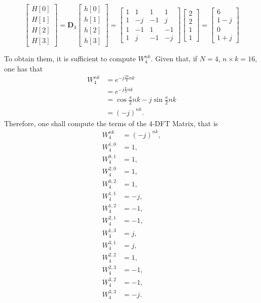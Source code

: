 \documentclass[\documentfontsize, twocolumn]{\classname}
\begin{document}
\begin{equation*}
    \begin{bmatrix} H[0] \\ H[1] \\ H[2] \\ H[3] \end{bmatrix}
        =
        \bm{D}_4
        \begin{bmatrix} h[0] \\ h[1] \\ h[2] \\ h[3] \end{bmatrix}
        =
        \begin{bmatrix}
            1 & 1 & 1 & 1 \\
            1 & -j & -1 & j \\
            1 & -1 & 1 & -1 \\
            1 & j & -1 & -j
        \end{bmatrix}
        \begin{bmatrix} 2 \\ 2 \\ 1 \\ 1 \end{bmatrix}
        =
        \begin{bmatrix}
            6 \\
            1 - j \\
            0 \\
            1 + j
        \end{bmatrix}
\end{equation*}

To obtain them, it is sufficient to compute $W_4^{nk}$. Given that, if $N=4$, $n \times k = 16$, one has that
\begin{align*}
    W_4^{nk} &= e ^ {-j\frac {2\pi}{4} nk}\\
             &= e ^ {-j\frac {\pi}{2} nk}\\
             &= \cos {\frac {\pi}{2} nk} - j\sin{\frac{\pi}{2}nk}\\
             &= (-j)^{nk}.
\end{align*}
Therefore, one shall compute the terms of the $4$-DFT Matrix, that is
\begin{align*}
    W_4^{nk} &= (-j)^{nk},\\
    W_4^{1,0} &= 1,\\
    W_4^{0,1} &= 1,\\
    W_4^{2,0} &= 1,\\
    W_4^{0,2} &= 1,\\
    W_4^{1,1} &= -j,\\
    W_4^{1,2} &= -1,\\
    W_4^{2,1} &= -1,\\
    W_4^{1,3} &= j,\\
    W_4^{3,1} &= j,\\
    W_4^{2,2} &= 1,\\
    W_4^{2,3} &= -1,\\
    W_4^{3,2} &= -1,\\
    W_4^{3,3} &= -j.
\end{align*}
\end{document}
